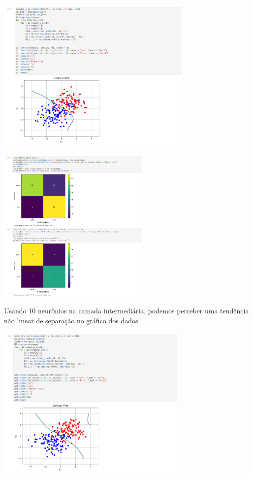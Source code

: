 \documentclass{article}
\begin{document}
\begin{center}

\includegraphics[height=3in]{exercise_pic/normals/sep_plot_normals5.png}
\vspace{10pt}

\end{center}

\begin{center}

\includegraphics[height=3in]{exercise_pic/normals/conf_matrix_normals5.png}
\vspace{10pt}
    
\end{center}
Usando 10 neurônios na camada intermediária, podemos perceber uma tendência não linear de separação no gráfico dos dados.

\begin{center}

\includegraphics[height=3in]{exercise_pic/normals/plot_data_normals_10.png}
\vspace{10pt}

\end{center}
\end{document}

